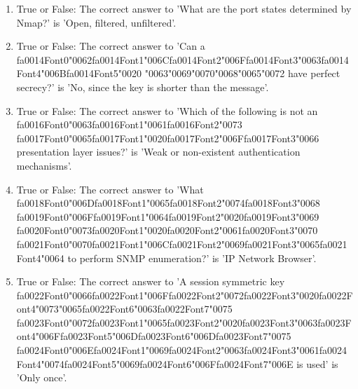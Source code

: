 \documentclass[12pt]{article}
\begin{document}
\begin{enumerate}[label=\arabic*.]
\item True or False: The correct answer to 'What are the port states determined by Nmap?' is 'Open, filtered, unfiltered'.
\item True or False: The correct answer to 'Can a {\csname fa0014Font0\endcsname\char"0062}{\csname fa0014Font1\endcsname\char"006C}{\csname fa0014Font2\endcsname\char"006F}{\csname fa0014Font3\endcsname\char"0063}{\csname fa0014Font4\endcsname\char"006B}{\csname fa0014Font5\endcsname\char"0020} {\char"0063}{\char"0069}{\char"0070}{\char"0068}{\char"0065}{\char"0072} have perfect secrecy?' is 'No, since the key is shorter than the message'.
\item True or False: The correct answer to 'Which of the following is not an {\csname fa0016Font0\endcsname\char"0063}{\csname fa0016Font1\endcsname\char"0061}{\csname fa0016Font2\endcsname\char"0073} {\csname fa0017Font0\endcsname\char"0065}{\csname fa0017Font1\endcsname\char"0020}{\csname fa0017Font2\endcsname\char"006F}{\csname fa0017Font3\endcsname\char"0066} presentation layer issues?' is 'Weak or non-existent authentication mechanisms'.
\item True or False: The correct answer to 'What {\csname fa0018Font0\endcsname\char"006D}{\csname fa0018Font1\endcsname\char"0065}{\csname fa0018Font2\endcsname\char"0074}{\csname fa0018Font3\endcsname\char"0068} {\csname fa0019Font0\endcsname\char"006F}{\csname fa0019Font1\endcsname\char"0064}{\csname fa0019Font2\endcsname\char"0020}{\csname fa0019Font3\endcsname\char"0069} {\csname fa0020Font0\endcsname\char"0073}{\csname fa0020Font1\endcsname\char"0020}{\csname fa0020Font2\endcsname\char"0061}{\csname fa0020Font3\endcsname\char"0070} {\csname fa0021Font0\endcsname\char"0070}{\csname fa0021Font1\endcsname\char"006C}{\csname fa0021Font2\endcsname\char"0069}{\csname fa0021Font3\endcsname\char"0065}{\csname fa0021Font4\endcsname\char"0064} to perform SNMP enumeration?' is 'IP Network Browser'.
\item True or False: The correct answer to 'A session symmetric key {\csname fa0022Font0\endcsname\char"0066}{\csname fa0022Font1\endcsname\char"006F}{\csname fa0022Font2\endcsname\char"0072}{\csname fa0022Font3\endcsname\char"0020}{\csname fa0022Font4\endcsname\char"0073}{\char"0065}{\csname fa0022Font6\endcsname\char"0063}{\csname fa0022Font7\endcsname\char"0075} {\csname fa0023Font0\endcsname\char"0072}{\csname fa0023Font1\endcsname\char"0065}{\csname fa0023Font2\endcsname\char"0020}{\csname fa0023Font3\endcsname\char"0063}{\csname fa0023Font4\endcsname\char"006F}{\csname fa0023Font5\endcsname\char"006D}{\csname fa0023Font6\endcsname\char"006D}{\csname fa0023Font7\endcsname\char"0075} {\csname fa0024Font0\endcsname\char"006E}{\csname fa0024Font1\endcsname\char"0069}{\csname fa0024Font2\endcsname\char"0063}{\csname fa0024Font3\endcsname\char"0061}{\csname fa0024Font4\endcsname\char"0074}{\csname fa0024Font5\endcsname\char"0069}{\csname fa0024Font6\endcsname\char"006F}{\csname fa0024Font7\endcsname\char"006E} is used' is 'Only once'.

\end{enumerate}
\end{document}
